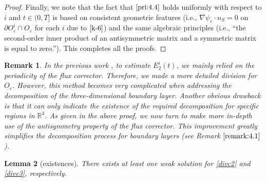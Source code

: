 \documentclass[13pt,CJK]{article}
\theoremstyle{plain}                       %
\newtheorem{lemma}{Lemma}[section]
\newtheorem{remark}[lemma]{Remark}
\theoremstyle{remark}
\numberwithin{equation}{section}
\begin{document}
\begin{proof}
Finally, we note that the fact that $\eqref{pri:4.4}$ holds uniformly with respect to $i$ and $t\in(0,T]$ is based on consistent geometric features
(i.e., $\nabla\psi_\varepsilon\cdot n_S =0$ on $\partial O_\varepsilon^i
\cap O_\varepsilon$ for each $i$ due to $\eqref{k-6}$) and the same algebraic principles
(i.e., ``the second-order inner product of an antisymmetric matrix and a symmetric matrix is equal to zero.''). This completes all the proofs.
\end{proof}


\begin{remark}\label{remark:4.2}
\emph{In the previous work \cite{Wang-Xu-Zhang22}, to estimate $E_2^i(t)$, we mainly relied on the periodicity of the flux corrector. Therefore, we made a more detailed division for $O_\varepsilon$. However, this method becomes very complicated when addressing the decomposition of the three-dimensional boundary layer. Another obvious drawback is that it can only indicate the existence of the required decomposition for specific regions in $\mathbb{R}^3$. As given in the above proof, we now turn to make more in-depth use of the antisymmetry property of the flux corrector.  This improvement greatly simplifies the decomposition process for boundary layers (see Remark $\ref{remark:4.1}$).}
\end{remark}


\begin{lemma}[existences]\label{lemma3.6}
There exists at least one weak solution for \eqref{divc2} and \eqref{divc3}, respectively.
\end{lemma}
\end{document}
